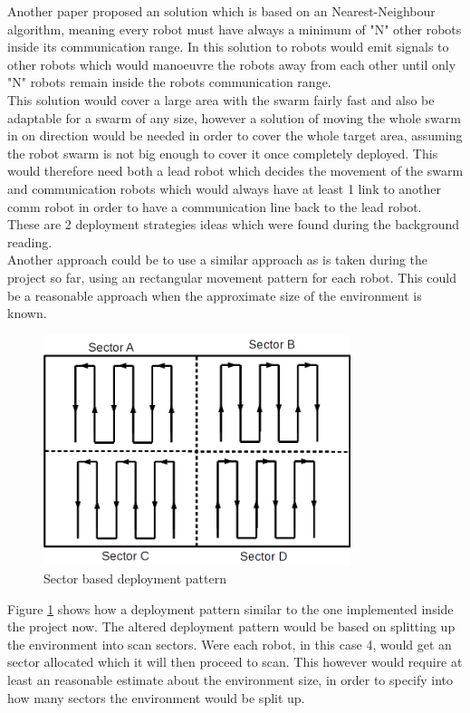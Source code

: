 Another paper proposed an solution which is based on an Nearest-Neighbour algorithm, meaning every robot must have always a minimum of "N" other robots inside its communication range\cite{Poduri2004Constrained}. In this solution to robots would emit signals to other robots which would manoeuvre the robots away from each other until only "N" robots remain inside the robots communication range. \\
This solution would cover a large area with the swarm fairly fast and also be adaptable for a swarm of any size, however a solution of moving the whole swarm in on direction would be needed in order to cover the whole target area, assuming the robot swarm is not big enough to cover it once completely deployed.
This would therefore need both a lead robot which decides the movement of the swarm and communication robots which would always have at least 1 link to another comm robot in order to have a communication line back to the lead robot. \\
These are 2 deployment strategies ideas which were found during the background reading.  \\[3ex]

Another approach could be to use a similar approach as is taken during the project so far, using an rectangular movement pattern for each robot. This could be a reasonable approach when the approximate size of the environment is known.

\begin{figure}[h]
\centering
\includegraphics[width = 0.8\textwidth]{../../figures/deployment_sector_pattern} 
\caption{Sector based deployment pattern}
\label{deployment_sector_pattern}
\end{figure}

Figure \ref{deployment_sector_pattern} shows how a deployment pattern similar to the one implemented inside the project now. 
The altered deployment pattern would be based on splitting up the environment into scan sectors. Were each robot, in this case 4, would get an sector allocated which it will then proceed to scan. This however would require at least an reasonable estimate about  the environment size, in order to specify into how many sectors the environment would be split up. 

